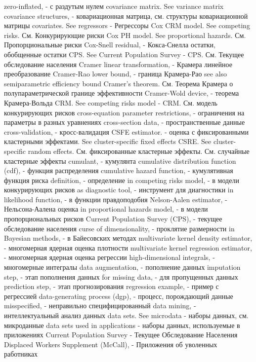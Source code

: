 zero-inflated, - с раздутым нулем
covariance matrix. See variance matrix covariance structures, - ковариационная матрица, см. структуры ковариационной матрицы
covariates. See regressors - Регрессоры
Cox CRM model. See competing risks. См. Конкурирующие риски
Cox PH model. See proportional hazards. См. Пропорциональные риски
Cox-Snell residual, - Кокса-Снелла остатки, обобщенные остатки
CPS. See Current Population Survey - CPS. См. Текущее обследование населения
Cramer linear transformation, - Крамера линейное преобразование
Cramer-Rao lower bound, - граница Крамера-Рао
see also semiparametric efficiency bound Cramer’s theorem. См. Теорема Крамера о полупараметрической границе эффективности
Cramer-Wold device, - теорема Крамера-Вольда
CRM. See competing risks model - CRM. См. модель конкурирующих рисков
cross-equation parameter restrictions, - ограничения на параметры в разных уравнениях
cross-section data, - пространственные данные
cross-validation, - кросс-валидация
CSFE estimator. - оценка с фиксированными кластерными эффектами. See cluster-specific fixed effects CSRE. See cluster-specific random effects. См. фиксированные кластерные эффекты. См. случайные кластерные эффекты
cumulant, - кумулянта
cumulative distribution function (cdf), - функция распределения
cumulative hazard function, - кумулятивная функция риска
definition, - определение
in competing risks model, - в модели конкурирующих рисков
as diagnostic tool, - инструмент для диагностики
in likelihood function, - в функции правдоподобия
Nelson-Aalen estimator, - Нельсона-Аалена оценка
in proportional hazards model, - в модели пропорциональных рисков
Current Population Survey (CPS), - текущее обследование населения
curse of dimensionality, - проклятие размерности
in Bayesian methods, - в Байесовских методах
multivariate kernel density estimator, - многомерная ядерная оценка плотности   
multivariate kernel regression estimator, - многомерная ядерная оценка регрессии
high-dimensional integrals, - многомерные интегралы
data augmentation, - пополнение данных
imputation step, - этап пополнения данных
for missing data, - для пропущенных данных
prediction step, - этап прогнозирования 
regression example, - пример с регрессией
data-generating process (dgp), - процесс, порождающий данные
misspecified, - неправильно специфицированный
data mining, - интеллектуальный анализ данных
data sets. See microdata - наборы данных, см. микроданные
data sets used in applications - наборы данных, используемые в приложениях
Current Population Survey - Текущее Обследование Населения
Displaced Workers Supplement (McCall), - Приложения об уволенных работниках
